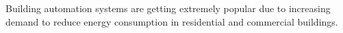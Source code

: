 Building automation systems are getting extremely popular due to increasing demand to reduce energy consumption in residential and commercial  buildings. 